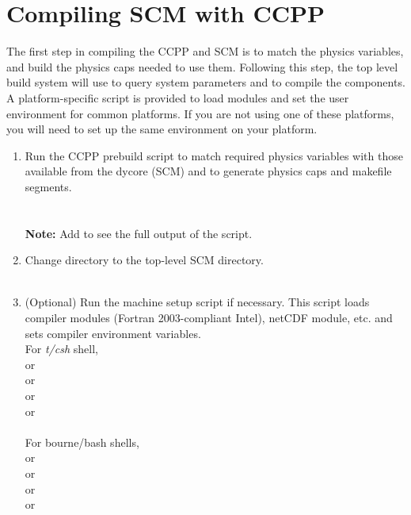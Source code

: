 \section{Compiling SCM with CCPP}
\label{section: compiling}

The first step in compiling the CCPP and SCM is to match the physics variables, and build the physics caps needed to use them.  Following this step, the top level build system will use  to query system parameters and  to compile the components.  A platform-specific script is provided to load modules and set the user environment for common platforms.  If you are not using one of these platforms, you will need to set up the same environment on your platform.

\begin{enumerate}
	\item Run the CCPP prebuild script to match required physics variables with those available from the dycore (SCM) and to generate physics caps and makefile segments.\\
  		\\ \\
  	\textbf{Note:} Add  to see the full output of the script.\\ 
	\item Change directory to the top-level SCM directory.\\
  		 \\
	\item (Optional) Run the machine setup script if necessary. This script loads compiler modules (Fortran 2003-compliant Intel), netCDF module, etc. and sets compiler environment variables.  \\
For \textit{t/csh} shell, \\
  		 or\\
 		 or\\
		 or\\
		 or\\
		\\

For bourne/bash shells,\\
   or\\
   or\\
   or\\
   or\\
  \\
  

\end{enumerate}
